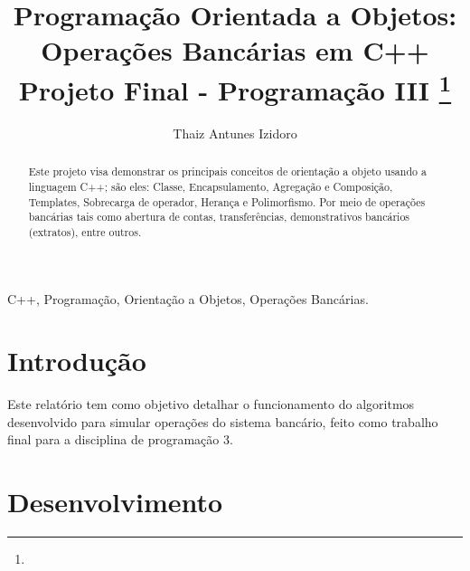 \documentclass[conference]{IEEEtran}
\begin{document}
\title{Programação Orientada a Objetos: Operações Bancárias em C++\\
{\footnotesize Projeto Final - Programação III}
\thanks{}
}


\author{
\and
{Thaiz Antunes Izidoro}\\
}


\maketitle

\begin{abstract}
    Este projeto visa demonstrar os principais conceitos de orientação a objeto usando a linguagem C++; são eles: Classe, Encapsulamento, Agregação e Composição, Templates, Sobrecarga de operador, Herança e Polimorfismo. Por meio  de operações bancárias tais como abertura de contas, transferências, demonstrativos bancários (extratos), entre outros. 
\end{abstract}

\begin{IEEEkeywords}
    C++, Programação, Orientação a Objetos, Operações Bancárias.
\end{IEEEkeywords}

\section{Introdução}
Este relatório tem como objetivo detalhar o funcionamento
do algoritmos desenvolvido para simular operações do sistema bancário, feito como trabalho final
para a disciplina de programação 3.

\section{Desenvolvimento}
\end{document}
